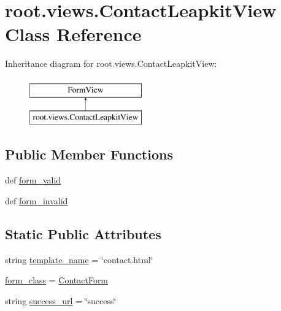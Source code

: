 \hypertarget{classroot_1_1views_1_1_contact_leapkit_view}{\section{root.\-views.\-Contact\-Leapkit\-View Class Reference}
\label{classroot_1_1views_1_1_contact_leapkit_view}
}
Inheritance diagram for root.\-views.\-Contact\-Leapkit\-View\-:\begin{figure}[H]
\begin{center}
\leavevmode
\includegraphics[height=2.000000cm]{classroot_1_1views_1_1_contact_leapkit_view}
\end{center}
\end{figure}
\subsection*{Public Member Functions}
\begin{DoxyCompactItemize}
\item 
def \hyperlink{classroot_1_1views_1_1_contact_leapkit_view_a077c408744e5d2164b19c80258e502f1}{form\-\_\-valid}
\item 
def \hyperlink{classroot_1_1views_1_1_contact_leapkit_view_aa8f1bfd04f49a8c8f5b24739dc35a9bc}{form\-\_\-invalid}
\end{DoxyCompactItemize}
\subsection*{Static Public Attributes}
\begin{DoxyCompactItemize}
\item 
string \hyperlink{classroot_1_1views_1_1_contact_leapkit_view_ad2ac561aa8443a14a1fcbc1aba7f9376}{template\-\_\-name} = \char`\"{}contact.\-html\char`\"{}
\item 
\hyperlink{classroot_1_1views_1_1_contact_leapkit_view_a9113e0f2bd6d60c2903df9e2c4b7d088}{form\-\_\-class} = \hyperlink{classqueries_1_1forms_1_1_contact_form}{Contact\-Form}
\item 
string \hyperlink{classroot_1_1views_1_1_contact_leapkit_view_ab7402fe5dccd1ab87377ce11e8cef1ee}{success\-\_\-url} = \char`\"{}success\char`\"{}
\end{DoxyCompactItemize}


